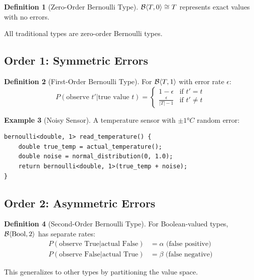 \documentclass[11pt,twoside,openright]{book}
\theoremstyle{definition}
\newtheorem{definition}{Definition}[chapter]
\newtheorem{example}[definition]{Example}
\theoremstyle{plain}
\theoremstyle{remark}
\begin{document}
\begin{definition}[Zero-Order Bernoulli Type]
$\mathcal{B}\langle T, 0 \rangle \cong T$ represents exact values with no errors.
\end{definition}

All traditional types are zero-order Bernoulli types.

\subsection{Order 1: Symmetric Errors}

\begin{definition}[First-Order Bernoulli Type]
For $\mathcal{B}\langle T, 1 \rangle$ with error rate $\epsilon$:
\begin{equation}
P(\text{observe } t' | \text{true value } t) = \begin{cases}
1 - \epsilon & \text{if } t' = t \\
\frac{\epsilon}{|T| - 1} & \text{if } t' \neq t
\end{cases}
\end{equation}
\end{definition}

\begin{example}[Noisy Sensor]
A temperature sensor with $\pm 1°C$ random error:
\begin{verbatim}
bernoulli<double, 1> read_temperature() {
    double true_temp = actual_temperature();
    double noise = normal_distribution(0, 1.0);
    return bernoulli<double, 1>(true_temp + noise);
}
\end{verbatim}
\end{example}

\subsection{Order 2: Asymmetric Errors}

\begin{definition}[Second-Order Bernoulli Type]
For Boolean-valued types, $\mathcal{B}\langle \text{Bool}, 2 \rangle$ has separate rates:
\begin{align}
P(\text{observe True} | \text{actual False}) &= \alpha \text{ (false positive)} \\
P(\text{observe False} | \text{actual True}) &= \beta \text{ (false negative)}
\end{align}
\end{definition}

This generalizes to other types by partitioning the value space.
\end{document}
